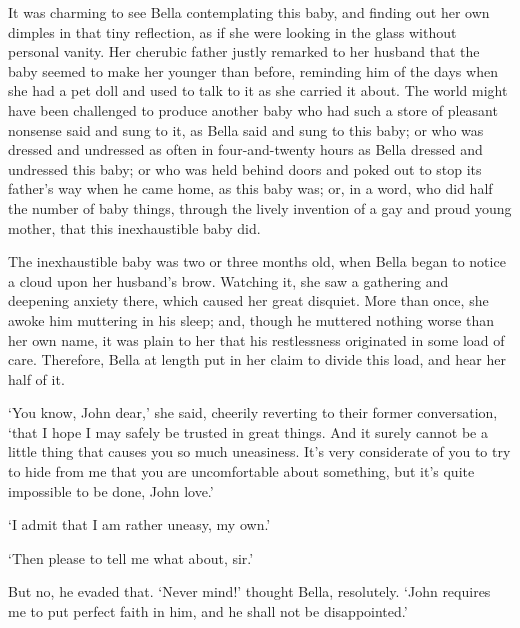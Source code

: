 It was charming to see Bella contemplating this baby, and finding out
her own dimples in that tiny reflection, as if she were looking in the
glass without personal vanity. Her cherubic father justly remarked
to her husband that the baby seemed to make her younger than before,
reminding him of the days when she had a pet doll and used to talk to it
as she carried it about. The world might have been challenged to produce
another baby who had such a store of pleasant nonsense said and sung
to it, as Bella said and sung to this baby; or who was dressed and
undressed as often in four-and-twenty hours as Bella dressed and
undressed this baby; or who was held behind doors and poked out to stop
its father’s way when he came home, as this baby was; or, in a word, who
did half the number of baby things, through the lively invention of a
gay and proud young mother, that this inexhaustible baby did.

The inexhaustible baby was two or three months old, when Bella began to
notice a cloud upon her husband’s brow. Watching it, she saw a gathering
and deepening anxiety there, which caused her great disquiet. More than
once, she awoke him muttering in his sleep; and, though he muttered
nothing worse than her own name, it was plain to her that his
restlessness originated in some load of care. Therefore, Bella at length
put in her claim to divide this load, and hear her half of it.

‘You know, John dear,’ she said, cheerily reverting to their former
conversation, ‘that I hope I may safely be trusted in great things. And
it surely cannot be a little thing that causes you so much uneasiness.
It’s very considerate of you to try to hide from me that you are
uncomfortable about something, but it’s quite impossible to be done,
John love.’

‘I admit that I am rather uneasy, my own.’

‘Then please to tell me what about, sir.’

But no, he evaded that. ‘Never mind!’ thought Bella, resolutely.
‘John requires me to put perfect faith in him, and he shall not be
disappointed.’

